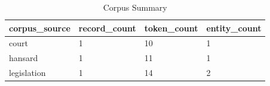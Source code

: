 \begin{table}[htbp]
\centering
\caption{Corpus Summary}
\label{tab:corpus-summary}
\begin{tabular}{llll}
\hline
corpus\_source & record\_count & token\_count & entity\_count \\
\hline
court & 1 & 10 & 1 \\
hansard & 1 & 11 & 1 \\
legislation & 1 & 14 & 2 \\
\hline
\end{tabular}
\end{table}
